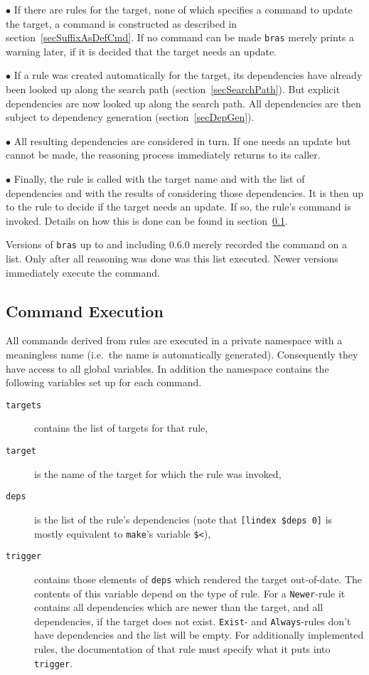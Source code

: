 \documentclass[12pt]{article}
\newcommand{\bras}{\texttt{bras}}
\newcommand{\make}{\texttt{make}}
\begin{document}
$\bullet$ If there are rules for the target, none of which specifies a
command to update the target, a command is constructed as described in
section~\ref{secSuffixAsDefCmd}. If no command can be made \bras{}
merely prints a warning later, if it is decided that the target needs
an update.

$\bullet$ If a rule was created automatically for the target, its
dependencies have already been looked up along the search path
(section~\ref{secSearchPath}). But explicit dependencies are now
looked up along the search path. All dependencies are then subject to
dependency generation (section~\ref{secDepGen}).

$\bullet$ All resulting dependencies are considered in turn. If one
needs an update but cannot be made, the reasoning process immediately
returns to its caller.

$\bullet$ Finally, the rule is called with the target name and with
the list of dependencies and with the results of considering those
dependencies. It is then up to the rule to decide if the target needs
an update. If so, the rule's command is invoked. Details on how this is
done can be found in section~\ref{secCmdExec}.

Versions of \bras{} up to and including 0.6.0 merely recorded the
command on a list. Only after all reasoning was done was this list
executed. Newer versions immediately execute the command.

\subsection{Command Execution}
\label{secCmdExec}

All commands derived from rules are executed in a private namespace
with a meaningless name (i.e.\ the name is automatically
generated). Consequently they have access to all global variables. In
addition the namespace contains the following variables set up for
each command.

\begin{description}
\item[\texttt{targets}] 
contains the list of targets for that rule,

\item[\texttt{target}] 
is the name of the target for which the rule
was invoked,

\item[\texttt{deps}] 
is the list of the rule's dependencies (note that \texttt{[lindex
  \$deps 0]} is mostly equivalent to \make's variable \texttt{\$<}),

\item[\texttt{trigger}]
contains those elements of \texttt{deps} which rendered the target
out-of-date. The contents of this variable depend on the type of
rule. For a \texttt{Newer}-rule it contains all dependencies which are
newer than the target, and all dependencies, if the target does not
exist. \texttt{Exist}- and \texttt{Always}-rules don't have
dependencies and the list will be empty. For additionally implemented
rules, the documentation of that rule must specify what it puts into
\texttt{trigger}. 
\end{description}
\end{document}
